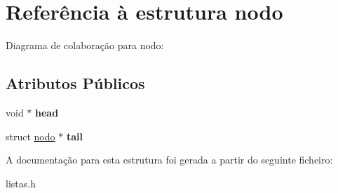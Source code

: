 \hypertarget{structnodo}{}\section{Referência à estrutura nodo}
\label{structnodo}


Diagrama de colaboração para nodo\+:
\subsection*{Atributos Públicos}
\begin{DoxyCompactItemize}
\item 
\mbox{\label{structnodo_a84e804ff33256ef9fc2667affcf0bed1}} 
void $\ast$ {\bfseries head}
\item 
\mbox{\label{structnodo_ae4cede7babb31055f5c770b71f0ff3e5}} 
struct \hyperlink{structnodo}{nodo} $\ast$ {\bfseries tail}
\end{DoxyCompactItemize}


A documentação para esta estrutura foi gerada a partir do seguinte ficheiro\+:\begin{DoxyCompactItemize}
\item 
listas.\+h\end{DoxyCompactItemize}
